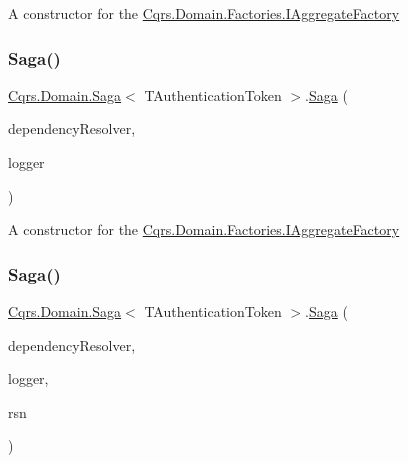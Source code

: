 A constructor for the \hyperlink{interfaceCqrs_1_1Domain_1_1Factories_1_1IAggregateFactory}{Cqrs.\+Domain.\+Factories.\+I\+Aggregate\+Factory} 

\mbox{\label{classCqrs_1_1Domain_1_1Saga_affa39972d1946ab9f5d2474b17acbdd4}} 
\subsubsection{\texorpdfstring{Saga()}{Saga()}\hspace{0.1cm}{\footnotesize\ttfamily [2/3]}}
{\footnotesize\ttfamily \hyperlink{classCqrs_1_1Domain_1_1Saga}{Cqrs.\+Domain.\+Saga}$<$ T\+Authentication\+Token $>$.\hyperlink{classCqrs_1_1Domain_1_1Saga}{Saga} (\begin{DoxyParamCaption}\item[{\hyperlink{interfaceCqrs_1_1Configuration_1_1IDependencyResolver}{I\+Dependency\+Resolver}}]{dependency\+Resolver,  }\item[{I\+Logger}]{logger }\end{DoxyParamCaption})\hspace{0.3cm}{\ttfamily [protected]}}



A constructor for the \hyperlink{interfaceCqrs_1_1Domain_1_1Factories_1_1IAggregateFactory}{Cqrs.\+Domain.\+Factories.\+I\+Aggregate\+Factory} 

\mbox{\label{classCqrs_1_1Domain_1_1Saga_acba7142c5e3ad568a60dc365fb7e8733}} 
\subsubsection{\texorpdfstring{Saga()}{Saga()}\hspace{0.1cm}{\footnotesize\ttfamily [3/3]}}
{\footnotesize\ttfamily \hyperlink{classCqrs_1_1Domain_1_1Saga}{Cqrs.\+Domain.\+Saga}$<$ T\+Authentication\+Token $>$.\hyperlink{classCqrs_1_1Domain_1_1Saga}{Saga} (\begin{DoxyParamCaption}\item[{\hyperlink{interfaceCqrs_1_1Configuration_1_1IDependencyResolver}{I\+Dependency\+Resolver}}]{dependency\+Resolver,  }\item[{I\+Logger}]{logger,  }\item[{Guid}]{rsn }\end{DoxyParamCaption})\hspace{0.3cm}{\ttfamily [protected]}}




